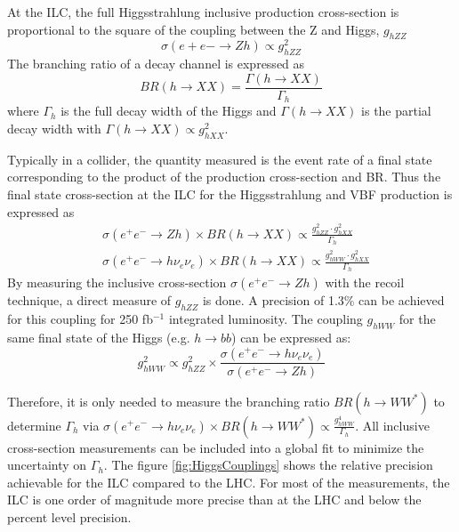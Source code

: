 At the ILC, the full Higgsstrahlung inclusive production cross-section is proportional to the square of the coupling between the Z and Higgs, $g_{hZZ}$
\begin{equation}
  \sigma(e+e- \rightarrow Zh) \propto g^2_{hZZ}
\end{equation}
The branching ratio of a decay channel is expressed as
\begin{equation}
  BR(h \rightarrow XX) = \frac{\Gamma(h \rightarrow XX)}{\Gamma_{h}}
\end{equation}
where $\Gamma_{h}$ is the full decay width of the Higgs and $\Gamma(h \rightarrow XX)$ is the partial decay width with $\Gamma(h \rightarrow XX) \propto g^2_{hXX}$.

Typically in a collider, the quantity measured is the event rate of a final state corresponding to the product of the production cross-section and BR. Thus the final state cross-section at the ILC for the Higgsstrahlung and VBF production is expressed as
\begin{equation}
  \begin{aligned}
    &\sigma(e^+e^- \rightarrow Zh) \times BR(h \rightarrow XX) \propto \frac{g^2_{hZZ} \cdot g^2_{hXX}}{\Gamma_{h}}\\
    &\sigma(e^+e^- \rightarrow h\nu_e\nu_e) \times BR(h \rightarrow XX) \propto \frac{g^2_{hWW} \cdot g^2_{hXX}}{\Gamma_{h}}
  \end{aligned}
\end{equation}
By measuring the inclusive cross-section $\sigma(e^+e^- \rightarrow Zh)$ with the recoil technique, a direct measure of $g_{hZZ}$ is done. A precision of 1.3\% can be achieved for this coupling for 250 fb$^{-1}$ integrated luminosity. The coupling $g_{hWW}$ for the same final state of the Higgs (e.g. $h \rightarrow bb$) can be expressed as:
\begin{equation}
  g^2_{hWW} \propto g^2_{hZZ} \times \frac{\sigma(e^+e^- \rightarrow h\nu_e\nu_e)}{\sigma(e^+e^- \rightarrow Zh)}
\end{equation}

Therefore, it is only needed to measure the branching ratio $BR(h \rightarrow WW^*)$ to determine $\Gamma_{h}$ via $\sigma(e^+e^- \rightarrow h\nu_e\nu_e) \times BR(h \rightarrow WW^*) \propto \frac{g^4_{hWW}}{\Gamma_{h}}$. All inclusive cross-section measurements can be included into a global fit to minimize the uncertainty on $\Gamma_{h}$. The figure \ref{fig:HiggsCouplings} shows the relative precision achievable for the ILC compared to the LHC. For most of the measurements, the ILC is one order of magnitude more precise than at the LHC and below the percent level precision.

